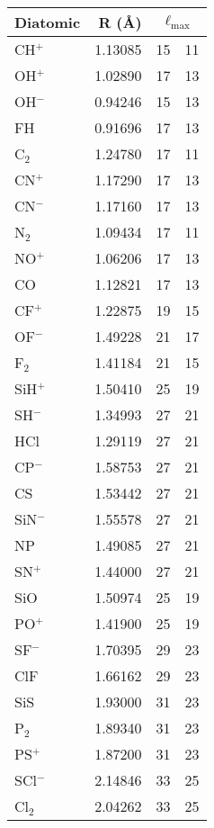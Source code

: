 \begin{tabular}{l|r|r|r}
\hline
\textbf{Diatomic} & \textbf{R} (\AA) & \multicolumn{2}{c}{$\mathbf{\ell_\mathrm{max}}$} \\
\hline
CH$^+$  & 1.13085 & 15 & 11 \\
OH$^+$  & 1.02890 & 17 & 13 \\
OH$^-$  & 0.94246 & 15 & 13 \\
FH      & 0.91696 & 17 & 13 \\
C$_2$   & 1.24780 & 17 & 11 \\
CN$^+$  & 1.17290 & 17 & 13 \\
CN$^-$  & 1.17160 & 17 & 13 \\
N$_2$   & 1.09434 & 17 & 11 \\
NO$^+$  & 1.06206 & 17 & 13 \\
CO      & 1.12821 & 17 & 13 \\
CF$^+$  & 1.22875 & 19 & 15 \\
OF$^-$  & 1.49228 & 21 & 17 \\
F$_2$   & 1.41184 & 21 & 15 \\
SiH$^+$ & 1.50410 & 25 & 19 \\
SH$^-$  & 1.34993 & 27 & 21 \\
HCl     & 1.29119 & 27 & 21 \\
CP$^-$  & 1.58753 & 27 & 21 \\
CS      & 1.53442 & 27 & 21 \\
SiN$^-$ & 1.55578 & 27 & 21 \\
NP      & 1.49085 & 27 & 21 \\
SN$^+$  & 1.44000 & 27 & 21 \\
SiO     & 1.50974 & 25 & 19 \\
PO$^+$  & 1.41900 & 25 & 19 \\
SF$^-$  & 1.70395 & 29 & 23 \\
ClF     & 1.66162 & 29 & 23 \\
SiS     & 1.93000 & 31 & 23 \\
P$_2$   & 1.89340 & 31 & 23 \\
PS$^+$  & 1.87200 & 31 & 23 \\
SCl$^-$ & 2.14846 & 33 & 25 \\
Cl$_2$  & 2.04262 & 33 & 25 \\
\hline
\end{tabular}